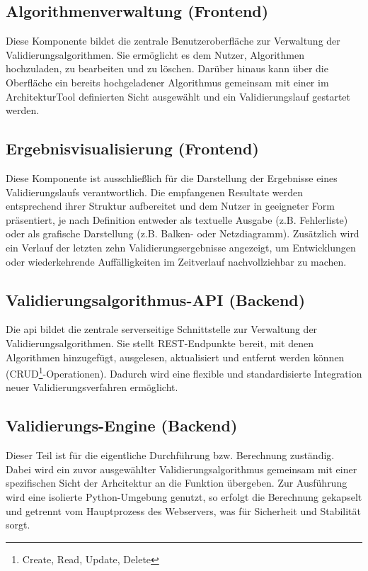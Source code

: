 \subsection*{Algorithmenverwaltung (Frontend)}

Diese Komponente bildet die zentrale Benutzeroberfläche zur Verwaltung der Validierungsalgorithmen. Sie ermöglicht es dem Nutzer, Algorithmen hochzuladen, zu bearbeiten und zu löschen. Darüber hinaus kann über die Oberfläche ein bereits hochgeladener Algorithmus gemeinsam mit einer im ArchitekturTool definierten Sicht ausgewählt und ein Validierungslauf gestartet werden.

\subsection*{Ergebnisvisualisierung (Frontend)}

Diese Komponente ist ausschließlich für die Darstellung der Ergebnisse eines Validierungslaufs verantwortlich. Die empfangenen Resultate werden entsprechend ihrer Struktur aufbereitet und dem Nutzer in geeigneter Form präsentiert, je nach Definition entweder als textuelle Ausgabe (z.B. Fehlerliste) oder als grafische Darstellung (z.B. Balken- oder Netzdiagramm). Zusätzlich wird ein Verlauf der letzten zehn Validierungsergebnisse angezeigt, um Entwicklungen oder wiederkehrende Auffälligkeiten im Zeitverlauf nachvollziehbar zu machen.

\subsection*{Validierungsalgorithmus-API (Backend)}

Die \gls{api} bildet die zentrale serverseitige Schnittstelle zur Verwaltung der Validierungsalgorithmen. Sie stellt REST-Endpunkte bereit, mit denen Algorithmen hinzugefügt, ausgelesen, aktualisiert und entfernt werden können (CRUD\footnote{Create, Read, Update, Delete}-Operationen). Dadurch wird eine flexible und standardisierte Integration neuer Validierungsverfahren ermöglicht.

\subsection*{Validierungs-Engine (Backend)}

Dieser Teil ist für die eigentliche Durchführung bzw. Berechnung zuständig. Dabei wird ein zuvor ausgewählter Validierungsalgorithmus gemeinsam mit einer spezifischen Sicht der Arhcitektur an die Funktion übergeben. Zur Ausführung wird eine isolierte Python-Umgebung genutzt, so erfolgt die Berechnung gekapselt und getrennt vom Hauptprozess des Webservers, was für Sicherheit und Stabilität sorgt.\\


